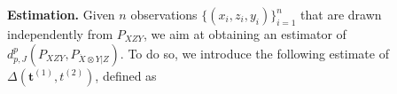 \textbf{Estimation.} Given $n$ observations $\{(x_i,z_i,y_i)\}_{i=1}^n$ that are drawn independently from $P_{XZY}$, we aim at obtaining an estimator of $ d_{p,J}^p (P_{XZY},P_{\ddot{X}\otimes Y|Z})$.
To do so, we introduce the following estimate of $\Delta(\mathbf{t}^{(1)},t^{(2)})$, defined as
